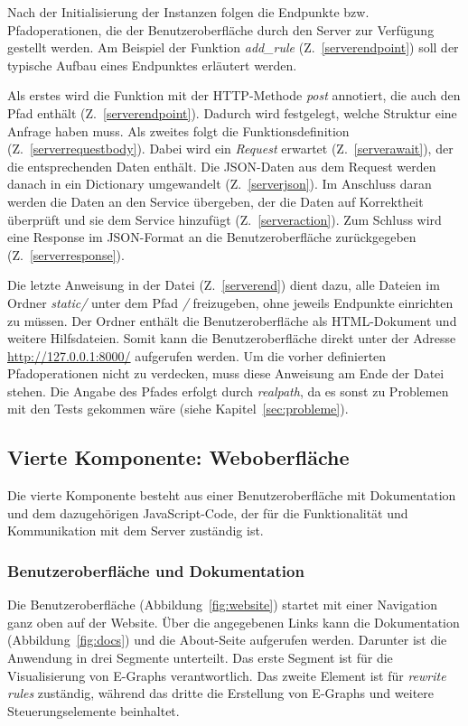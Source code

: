 Nach der Initialisierung der Instanzen folgen die Endpunkte bzw. Pfadoperationen, die der Benutzeroberfläche durch den Server zur Verfügung gestellt werden.
Am Beispiel der Funktion \textit{add\_rule} (Z.~\ref{serverendpoint}) soll der typische Aufbau eines Endpunktes erläutert werden.

Als erstes wird die Funktion mit der HTTP-Methode \textit{post} annotiert, die auch den Pfad enthält (Z.~\ref{serverendpoint}).
Dadurch wird festgelegt, welche Struktur eine Anfrage haben muss.
Als zweites folgt die Funktionsdefinition (Z.~\ref{serverrequestbody}). Dabei wird ein \textit{Request} erwartet (Z.~\ref{serverawait}), der die entsprechenden Daten enthält. 
Die JSON-Daten aus dem Request werden danach in ein Dictionary umgewandelt (Z.~\ref{serverjson}).
Im Anschluss daran werden die Daten an den Service übergeben, der die Daten auf Korrektheit überprüft und sie dem Service hinzufügt (Z.~\ref{serveraction}).
Zum Schluss wird eine Response im JSON-Format an die Benutzeroberfläche zurückgegeben (Z.~\ref{serverresponse}).

Die letzte Anweisung in der Datei (Z.~\ref{serverend}) dient dazu, alle Dateien im Ordner \textit{static/} unter dem Pfad \textit{/} freizugeben, ohne jeweils Endpunkte einrichten zu müssen.
Der Ordner enthält die Benutzeroberfläche als HTML-Dokument und weitere Hilfsdateien. Somit kann die Benutzeroberfläche direkt unter der Adresse \url{http://127.0.0.1:8000/}
aufgerufen werden. Um die vorher definierten Pfadoperationen nicht zu verdecken, muss diese Anweisung am Ende der Datei stehen.
Die Angabe des Pfades erfolgt durch \textit{realpath}, da es sonst zu Problemen mit den Tests gekommen wäre (siehe Kapitel~\ref{sec:probleme}).

\subsection{Vierte Komponente: Weboberfläche}

Die vierte Komponente besteht aus einer Benutzeroberfläche mit Dokumentation und dem dazugehörigen JavaScript-Code, der für die Funktionalität und Kommunikation mit dem Server
zuständig ist.

\subsubsection{Benutzeroberfläche und Dokumentation}

Die Benutzeroberfläche (Abbildung~\ref{fig:website}) startet mit einer Navigation ganz oben auf der Website. Über die angegebenen Links kann die Dokumentation (Abbildung~\ref{fig:docs}) und die About-Seite aufgerufen werden.
Darunter ist die Anwendung in drei Segmente unterteilt. Das erste Segment ist für die Visualisierung von E-Graphs verantwortlich. Das zweite Element ist für \textit{rewrite rules} zuständig, während das dritte 
die Erstellung von E-Graphs und weitere Steuerungselemente beinhaltet.

